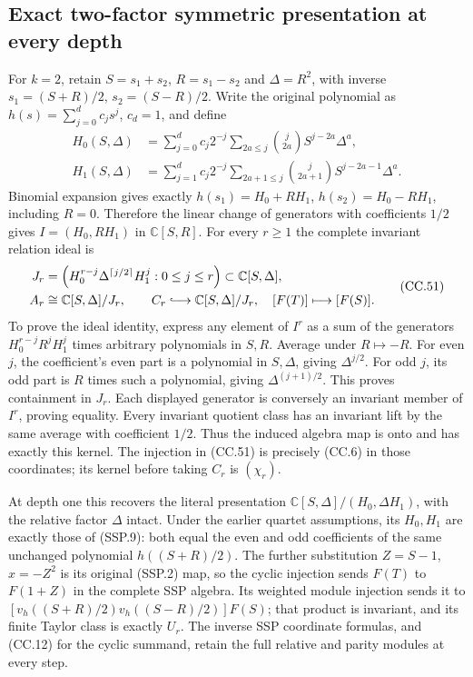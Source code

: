 \subsection{Exact two-factor symmetric presentation at every depth}

For \(k=2\), retain \(S=s_1+s_2\), \(R=s_1-s_2\) and
\(\Delta=R^2\), with inverse \(s_1=(S+R)/2\),
\(s_2=(S-R)/2\).  Write the original polynomial as
\(h(s)=\sum_{j=0}^d c_js^j\), \(c_d=1\), and define
\[
 \begin{aligned}
 H_0(S,\Delta)
    &=\sum_{j=0}^d c_j2^{-j}
         \sum_{2a\le j}\binom j{2a}S^{j-2a}\Delta^a,\\
 H_1(S,\Delta)
    &=\sum_{j=1}^d c_j2^{-j}
         \sum_{2a+1\le j}\binom j{2a+1}
                  S^{j-2a-1}\Delta^a.
 \end{aligned}\tag{CC.50}
\]
Binomial expansion gives exactly
\(h(s_1)=H_0+RH_1\), \(h(s_2)=H_0-RH_1\), including
\(R=0\).  Therefore the linear change of generators with coefficients
\(1/2\) gives \(I=(H_0,RH_1)\) in \(\mathbb C[S,R]\).
For every \(r\ge1\) the complete invariant relation ideal is
\[
 \begin{aligned}
 J_r&=\left(H_0^{r-j}\Delta^{\lceil j/2\rceil}H_1^j
                   :0\le j\le r\right)\subset\mathbb C[S,\Delta],\\
 A_r&\cong\mathbb C[S,\Delta]/J_r,
 \qquad
 C_r\lhook\joinrel\longrightarrow\mathbb C[S,\Delta]/J_r,
       \quad[F(T)]\longmapsto[F(S)].
 \end{aligned}\tag{CC.51}
\]
To prove the ideal identity, express any element of \(I^r\) as
a sum of the generators \(H_0^{r-j}R^jH_1^j\) times arbitrary
polynomials in \(S,R\).  Average under \(R\mapsto-R\).
For even \(j\), the coefficient's even part is a polynomial in
\(S,\Delta\), giving \(\Delta^{j/2}\).  For odd \(j\), its
odd part is \(R\) times such a polynomial, giving
\(\Delta^{(j+1)/2}\).  This proves containment in \(J_r\).
Each displayed generator is conversely an invariant member of
\(I^r\), proving equality.  Every invariant quotient class has
an invariant lift by the same average with coefficient \(1/2\).
Thus the induced algebra map is onto and has exactly this kernel.
The injection in (CC.51) is precisely (CC.6) in those coordinates;
its kernel before taking \(C_r\) is \((\chi_r)\).

At depth one this recovers the literal presentation
\(\mathbb C[S,\Delta]/(H_0,\Delta H_1)\), with the relative
factor \(\Delta\) intact.  Under the earlier quartet assumptions,
its \(H_0,H_1\) are exactly those of (SSP.9): both equal the
even and odd coefficients of the same unchanged polynomial
\(h((S+R)/2)\).  The further substitution \(Z=S-1\),
\(x=-Z^2\) is its original (SSP.2) map, so the cyclic injection
sends \(F(T)\) to \(F(1+Z)\) in the complete SSP algebra.
Its weighted module injection sends it to
\([v_h((S+R)/2)v_h((S-R)/2)]F(S)\); that product is invariant,
and its finite Taylor class is exactly \(U_r\).
The inverse SSP coordinate formulas, and (CC.12) for the cyclic
summand, retain the full relative and parity modules at every step.

